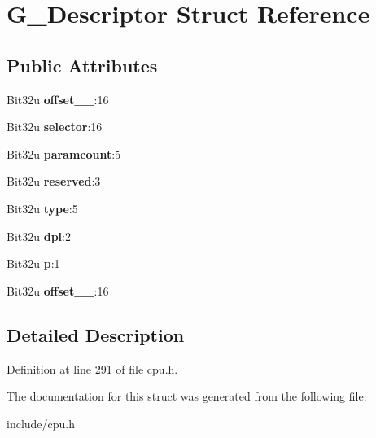 \hypertarget{structG__Descriptor}{\section{G\-\_\-\-Descriptor Struct Reference}
\label{structG__Descriptor}
}
\subsection*{Public Attributes}
\begin{DoxyCompactItemize}
\item 
\hypertarget{structG__Descriptor_ae7eac20d4a45102dbdb5ff442af9360e}{Bit32u {\bfseries offset\-\_\-\_}\-:16}\label{structG__Descriptor_ae7eac20d4a45102dbdb5ff442af9360e}

\item 
\hypertarget{structG__Descriptor_a66f4c899b74dad2fab890f0fc7321f24}{Bit32u {\bfseries selector}\-:16}\label{structG__Descriptor_a66f4c899b74dad2fab890f0fc7321f24}

\item 
\hypertarget{structG__Descriptor_a5db5a0455afaf116c09459b3084909c0}{Bit32u {\bfseries paramcount}\-:5}\label{structG__Descriptor_a5db5a0455afaf116c09459b3084909c0}

\item 
\hypertarget{structG__Descriptor_aba2e9e4b05526b04e3af1eb955a9e54c}{Bit32u {\bfseries reserved}\-:3}\label{structG__Descriptor_aba2e9e4b05526b04e3af1eb955a9e54c}

\item 
\hypertarget{structG__Descriptor_abf15e89abb33521d5f7f73a6e0aba787}{Bit32u {\bfseries type}\-:5}\label{structG__Descriptor_abf15e89abb33521d5f7f73a6e0aba787}

\item 
\hypertarget{structG__Descriptor_a8d226fa69f85928cbec3302f4013eec0}{Bit32u {\bfseries dpl}\-:2}\label{structG__Descriptor_a8d226fa69f85928cbec3302f4013eec0}

\item 
\hypertarget{structG__Descriptor_a2119158ac5abf18fe9bad195df2a4513}{Bit32u {\bfseries p}\-:1}\label{structG__Descriptor_a2119158ac5abf18fe9bad195df2a4513}

\item 
\hypertarget{structG__Descriptor_a3361c144843af13dc5141a6759d98606}{Bit32u {\bfseries offset\-\_\-\_}\-:16}\label{structG__Descriptor_a3361c144843af13dc5141a6759d98606}

\end{DoxyCompactItemize}


\subsection{Detailed Description}


Definition at line 291 of file cpu.\-h.



The documentation for this struct was generated from the following file\-:\begin{DoxyCompactItemize}
\item 
include/cpu.\-h\end{DoxyCompactItemize}
